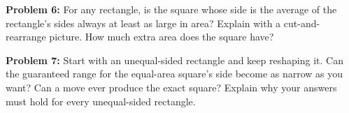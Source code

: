 \documentclass[12pt]{article}
\newcommand{\band}{Grades 3--5}
\newcommand{\problem}[2]{\par\textbf{Problem #1:} #2\par}
\begin{document}
\newpage

\renewcommand{\band}{Grades 4--5, ready for general reasoning}

\problem{6}{For any rectangle, is the square whose side is the average of the rectangle's sides always at least as large in area? Explain with a cut-and-rearrange picture. How much extra area does the square have?}

\begin{center}
\end{center}
\vspace{19mm}

\problem{7}{Start with an unequal-sided rectangle and keep reshaping it. Can the guaranteed range for the equal-area square's side become as narrow as you want? Can a move ever produce the exact square? Explain why your answers must hold for every unequal-sided rectangle.}

\vfill
\end{document}
